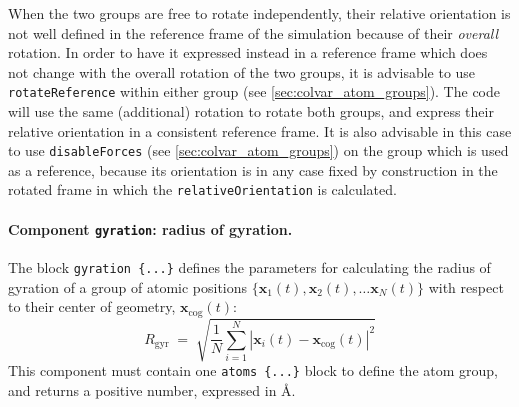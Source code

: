 When the two groups are free to rotate independently, their relative
orientation is not well defined in the reference frame of the
simulation because of their \emph{overall} rotation.  In order to have
it expressed instead in a reference frame which does not change with
the overall rotation of the two groups, it is advisable to use
\texttt{rotateReference} within either group (see
\ref{sec:colvar_atom_groups}).  The code will use the same
(additional) rotation to rotate both groups, and express their
relative orientation in a consistent reference frame.  It is also
advisable in this case to use \texttt{disableForces} (see
\ref{sec:colvar_atom_groups}) on the group which is used as a
reference, because its orientation is in any case fixed by
construction in the rotated frame in which the
\texttt{relativeOrientation} is calculated.



\paragraph*{Component \texttt{gyration}: radius of gyration.}  The
block \texttt{gyration~\{...\}} defines the parameters for
calculating the radius of gyration of a group of atomic positions $\{
\mathbf{x}_1(t), \mathbf{x}_2(t), \ldots \mathbf{x}_N(t) \}$ with
respect to their center of geometry, $\mathbf{x}_{\mathrm{cog}}(t)$:
\begin{equation}
  \label{eq:colvar_gyration}
  R_{\mathrm{gyr}} \; = \; \sqrt{ \frac{1}{N}
    \sum_{i=1}^{N} \left|\mathbf{x}_{i}(t) -
      \mathbf{x}_{\mathrm{cog}}(t)\right|^{2} }
\end{equation}
This component must contain one \texttt{atoms~\{...\}} block to
define the atom group, and returns a positive number, expressed in
\AA{}.



